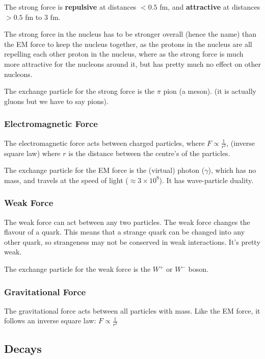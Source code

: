 \documentclass[a4paper, 12pt]{article}
\begin{document}
The strong force is {\textbf{repulsive}} at distances $< 0.5$ fm, and {\textbf{attractive}} at distances $> 0.5$ fm to $3$ fm.

The strong force in the nucleus has to be stronger overall (hence the name) than the EM force to keep the nucleus together, as the protons in the nucleus are all repelling each other proton in the nucleus, where as the strong force is much more attractive for the nucleons around it, but has pretty much no effect on other nucleons.

The exchange particle for the strong force is the $\pi$ pion (a meson). (it is actually gluons but we have to say pions).


\subsubsection{Electromagnetic Force}

The electromagnetic force acts between charged particles, where $F \propto \frac{1}{r^2}$, (inverse square law) where $r$ is the distance between the centre's of the particles.

The exchange particle for the EM force is the (virtual) photon ($\gamma$), which has no mass, and travels at the speed of light ($\approx 3 \times 10^8$). It has wave-particle duality.

\subsubsection{Weak Force}

The weak force can act between any two particles. The weak force changes the flavour of a quark. This means that a strange quark can be changed into any other quark, so strangeness may not be conserved in weak interactions. It's pretty weak.

The exchange particle for the weak force is the $W^+$ or $W^-$ boson.

\subsubsection{Gravitational Force}

The gravitational force acts between all particles with mass. Like the EM force, it follows an inverse square law: $F \propto \frac{1}{r^2}$

\subsection{Decays}
\end{document}
